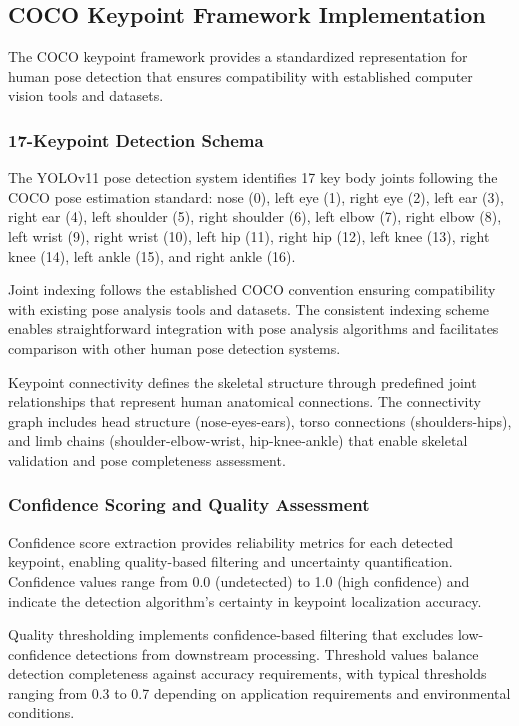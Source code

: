 \subsection{COCO Keypoint Framework Implementation}

The COCO keypoint framework provides a standardized representation for human pose detection that ensures compatibility with established computer vision tools and datasets.

\subsubsection{17-Keypoint Detection Schema}

The YOLOv11 pose detection system identifies 17 key body joints following the COCO pose estimation standard: nose (0), left eye (1), right eye (2), left ear (3), right ear (4), left shoulder (5), right shoulder (6), left elbow (7), right elbow (8), left wrist (9), right wrist (10), left hip (11), right hip (12), left knee (13), right knee (14), left ankle (15), and right ankle (16).

Joint indexing follows the established COCO convention ensuring compatibility with existing pose analysis tools and datasets. The consistent indexing scheme enables straightforward integration with pose analysis algorithms and facilitates comparison with other human pose detection systems.

Keypoint connectivity defines the skeletal structure through predefined joint relationships that represent human anatomical connections. The connectivity graph includes head structure (nose-eyes-ears), torso connections (shoulders-hips), and limb chains (shoulder-elbow-wrist, hip-knee-ankle) that enable skeletal validation and pose completeness assessment.

\subsubsection{Confidence Scoring and Quality Assessment}

Confidence score extraction provides reliability metrics for each detected keypoint, enabling quality-based filtering and uncertainty quantification. Confidence values range from 0.0 (undetected) to 1.0 (high confidence) and indicate the detection algorithm's certainty in keypoint localization accuracy.

Quality thresholding implements confidence-based filtering that excludes low-confidence detections from downstream processing. Threshold values balance detection completeness against accuracy requirements, with typical thresholds ranging from 0.3 to 0.7 depending on application requirements and environmental conditions.


